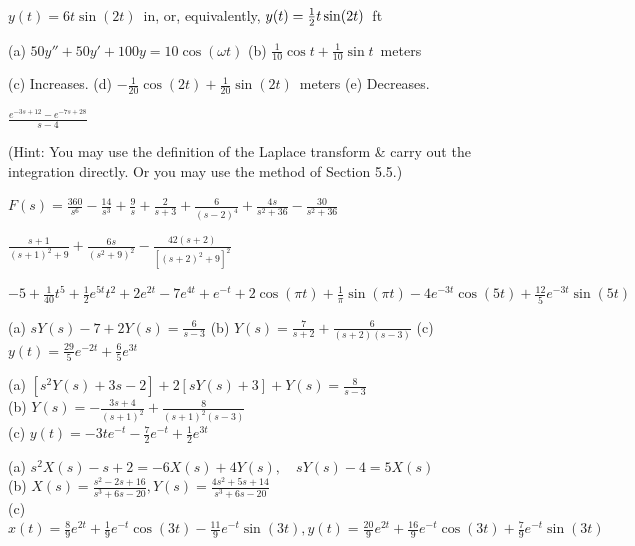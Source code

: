 \item
$y(t)=6t\sin(2t)$~in,
or, equivalently,
$y(t)={1\over 2}t\sin(2t)$~ft


\item
(a) $50y''+50y'+100y=10\cos(\omega t)$ \qquad
(b) $\frac{1}{10}\cos t +\frac{1}{10}\sin t$~meters

(c) Increases.\qquad
(d) $ -\frac{1}{20}\cos (2t) +\frac{1}{20}\sin (2t)$~meters \qquad
(e) Decreases.




\item
$\displaystyle \frac{ e^{-3s+12} - e^{-7s+28}  }{ s-4 }$
 
(Hint: You may use the definition of the Laplace transform \& carry out the integration directly. 
Or you may use the method of Section 5.5.)

\newpage

\item
$\displaystyle F(s)=\frac{360}{s^6}-\frac{14}{s^3}+\frac{9}{s}
+\frac{2}{s+3}+\frac{6}{(s-2)^4}
+\frac{4s}{s^2+36} -\frac{30}{s^2+36}$


\item
$\displaystyle \frac{s+1}{(s+1)^2 +9} +\frac{6s}{(s^2+9)^2} -\frac{42(s+2)}{[(s+2)^2 +9]^2}$


\item
$\displaystyle -5 +\frac{1}{40}t^5 +\frac{1}{2}e^{5t} t^2 +2e^{2t} -7e^{4t} +e^{-t}
+2\cos(\pi t) +\frac{1}{\pi}\sin(\pi t) 
-4e^{-3t}\cos(5t) +\frac{12}{5}e^{-3t}\sin(5t)$


\item
(a) $ sY(s)-7+2Y(s)=\frac{6}{s-3}$\qquad
(b) $ Y(s)=\frac{7}{s+2}+\frac{6}{(s+2)(s-3)}$\qquad
(c) $ y(t)=\frac{29}{5}e^{-2t} +\frac{6}{5}e^{3t}$

\item
(a) $ [s^2Y(s)+3s-2] +2[sY(s)+3] +Y(s)=\frac{8}{s-3}$\\
(b) $ Y(s)=-\frac{3s+4}{(s+1)^2}+\frac{8}{(s+1)^2(s-3)}$\\
(c) $ y(t)=-3te^{-t} -\frac{7}{2}e^{-t} +\frac{1}{2}e^{3t}$

\item
(a) $s^2 X(s)-s+2=-6X(s)+4Y(s),\quad sY(s)-4=5X(s)$\\
(b) $X(s)=\frac{s^2-2s+16}{s^3+6s-20}, Y(s)=\frac{4s^2+5s+14}{s^3+6s-20}$\\
(c) $x(t)=\frac{8}{9}e^{2t}+\frac{1}{9}e^{-t}\cos(3t)-\frac{11}{9}e^{-t}\sin(3t),
     y(t)=\frac{20}{9}e^{2t}+\frac{16}{9}e^{-t}\cos(3t)+\frac{7}{9}e^{-t}\sin(3t)$



